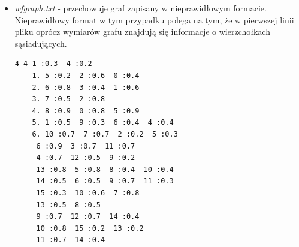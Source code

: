 \documentclass{article}
\begin{document}
\begin{itemize}
\newpage

\item \emph{wf\textunderscore graph.txt} - przechowuje graf zapisany w nieprawidłowym formacie. Nieprawidłowy format w tym przypadku polega na tym, że w pierwszej linii pliku oprócz wymiarów grafu znajdują się informacje o wierzchołkach sąsiadujących.
\begin{lstlisting}
4 4 1 :0.3  4 :0.2 
	1. 5 :0.2  2 :0.6  0 :0.4 
	2. 6 :0.8  3 :0.4  1 :0.6
	3. 7 :0.5  2 :0.8 
	4. 8 :0.9  0 :0.8  5 :0.9 
	5. 1 :0.5  9 :0.3  6 :0.4  4 :0.4 
	6. 10 :0.7  7 :0.7  2 :0.2  5 :0.3 
	 6 :0.9  3 :0.7  11 :0.7 
	 4 :0.7  12 :0.5  9 :0.2 
	 13 :0.8  5 :0.8  8 :0.4  10 :0.4 
	 14 :0.5  6 :0.5  9 :0.7  11 :0.3 
	 15 :0.3  10 :0.6  7 :0.8 
	 13 :0.5  8 :0.5 
	 9 :0.7  12 :0.7  14 :0.4 
	 10 :0.8  15 :0.2  13 :0.2 
	 11 :0.7  14 :0.4 
\end{lstlisting}

\end{itemize}
\end{document}
